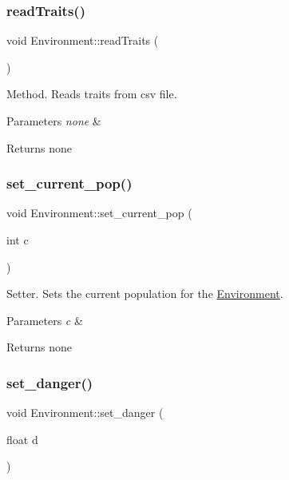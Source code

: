 \subsubsection{\texorpdfstring{read\+Traits()}{readTraits()}}
{\footnotesize\ttfamily void Environment\+::read\+Traits (\begin{DoxyParamCaption}{ }\end{DoxyParamCaption})}

Method. Reads traits from csv file. 
\begin{DoxyParams}{Parameters}
{\em none} & \\
\hline
\end{DoxyParams}
\begin{DoxyReturn}{Returns}
none 
\end{DoxyReturn}
\mbox{\label{class_environment_a5e18c76d6ee7629bab4b0d2800d0b0dd}} 
\subsubsection{\texorpdfstring{set\+\_\+current\+\_\+pop()}{set\_current\_pop()}}
{\footnotesize\ttfamily void Environment\+::set\+\_\+current\+\_\+pop (\begin{DoxyParamCaption}\item[{int}]{c }\end{DoxyParamCaption})}

Setter. Sets the current population for the \hyperlink{class_environment}{Environment}. 
\begin{DoxyParams}{Parameters}
{\em c} & \\
\hline
\end{DoxyParams}
\begin{DoxyReturn}{Returns}
none 
\end{DoxyReturn}
\mbox{\label{class_environment_aa573ecb533cea1336b6db7d983358db2}} 
\subsubsection{\texorpdfstring{set\+\_\+danger()}{set\_danger()}}
{\footnotesize\ttfamily void Environment\+::set\+\_\+danger (\begin{DoxyParamCaption}\item[{float}]{d }\end{DoxyParamCaption})}

